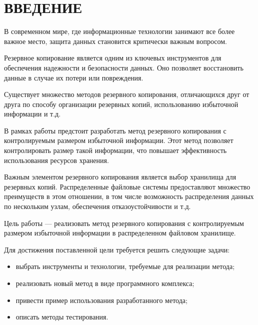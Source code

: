 \chapter*{ВВЕДЕНИЕ}

В современном мире, где информационные технологии занимают все более важное место, защита данных становится критически важным вопросом. 

Резервное копирование является одним из ключевых инструментов для обеспечения надежности и безопасности данных. Оно позволяет восстановить данные в случае их потери или повреждения.

Существует множество методов резервного копирования, отличающихся друг от друга по способу организации резервных копий, использованию избыточной информации и т.д. 

В рамках работы предстоит разработать метод резервного копирования с контролируемым размером избыточной информации. Этот метод позволяет контролировать размер такой информации, что повышает эффективность использования ресурсов хранения.

Важным элементом резервного копирования является выбор хранилища для резервных копий. Распределенные файловые системы предоставляют множество преимуществ в этом отношении, в том числе возможность распределения данных по нескольким узлам, обеспечения отказоустойчивости и т.д.

Цель работы --- реализовать метод резервного копирования с контролируемым размером избыточной информации в распределенном файловом хранилище.

Для достижения поставленной цели требуется решить следующие задачи:
\begin{itemize}
\item выбрать инструменты и технологии, требуемые для реализации метода;
\item реализовать новый метод в виде программного комплекса;
\item привести пример использования разработанного метода;
\item описать методы тестирования.
\end{itemize}
